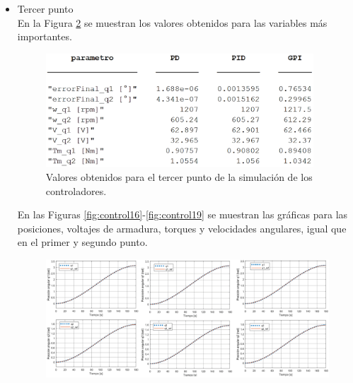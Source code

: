 \begin{itemize}
\begin{figure}[H]
    	\caption{Gráficas de las velocidades angulares de los motores para el segundo punto.}
    	\label{fig:control14}
    \end{figure}
    En las Figuras \ref{fig:control11}-\ref{fig:control14} se muestran las gráficas para las posiciones, voltajes de armadura, torques y velocidades angulares, de la misma forma que en el primer punto. Los resultados para este punto son similares al primer punto, el GPI mantiene un error superior al PD y PID, pero demanda menos voltaje de armadura y torque. Para la junta de $ q_2 $ ya se hace notoria la diferencia en el torque, lo que implica un mayor ahorro de energía por parte del GPI. Considerando que el error alcanzado por el GPI sigue siendo inferior a 1°, la idea de optar por este controlador se vuelve más sólida.
    \item Tercer punto\\
    En la Figura \ref{fig:control15} se muestran los valores obtenidos para las variables más importantes.
    \begin{figure}[H]
    	\centering
    	\includegraphics[width=10cm]{imagenes/control15}
    	\caption{Valores obtenidos para el tercer punto de la simulación de los controladores.}
    	\label{fig:control15}
    \end{figure}
    En las Figuras \ref{fig:control16}-\ref{fig:control19} se muestran las gráficas para las posiciones, voltajes de armadura, torques y velocidades angulares, igual que en el primer y segundo punto.
    \begin{figure}[H]
    	\centering
    	\includegraphics[width=\columnwidth]{imagenes/control16}

\end{figure}
\end{itemize}
